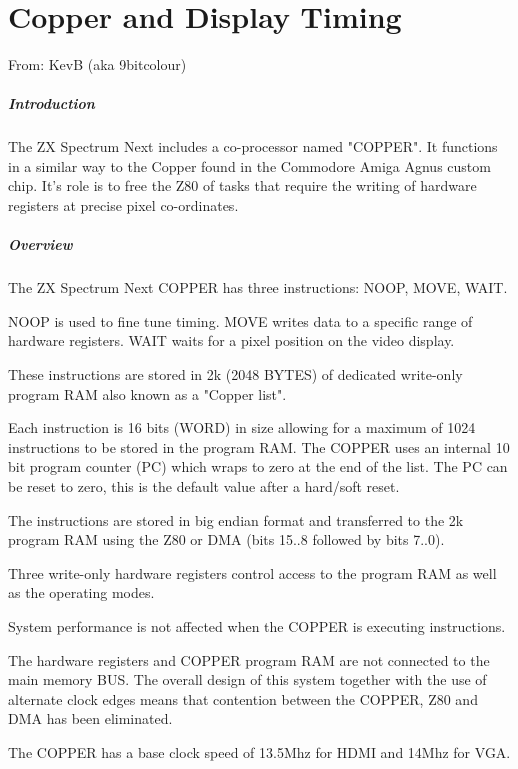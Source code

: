 \chapter{Copper and Display Timing}
From: KevB (aka 9bitcolour)

\paragraph{Introduction}

The ZX Spectrum Next includes a co-processor named "COPPER". It
functions in a similar way to the Copper found in the Commodore Amiga
Agnus custom chip.  It's role is to free the Z80 of tasks that require
the writing of hardware registers at precise pixel co-ordinates.

\paragraph{Overview}

The ZX Spectrum Next COPPER has three instructions: NOOP, MOVE, WAIT. 

NOOP is used to fine tune timing. MOVE writes data to a specific range
of hardware registers. WAIT waits for a pixel position on the video
display.

These instructions are stored in 2k (2048 BYTES) of dedicated
write-only program RAM also known as a "Copper list".

Each instruction is 16 bits (WORD) in size allowing for a maximum of
1024 instructions to be stored in the program RAM. The COPPER uses an
internal 10 bit program counter (PC) which wraps to zero at the end of
the list. The PC can be reset to zero, this is the default value after
a hard/soft reset.

The instructions are stored in big endian format and transferred to
the 2k program RAM using the Z80 or DMA (bits 15..8 followed by bits
7..0).

Three write-only hardware registers control access to the program RAM
as well as the operating modes.

System performance is not affected when the COPPER is executing instructions.

The hardware registers and COPPER program RAM are not connected to the
main memory BUS. The overall design of this system together with the
use of alternate clock edges means that contention between the COPPER,
Z80 and DMA has been eliminated.

The COPPER has a base clock speed of 13.5Mhz for HDMI and 14Mhz for VGA.

